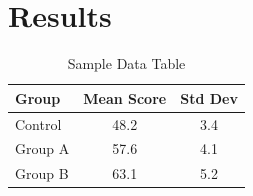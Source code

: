 \section{Results}
\label{sec:results}

\lipsum[5]

\begin{table}[H]
  \centering
  \caption{Sample Data Table}
  \label{tab:sample}
  \begin{tabular}{lcc}
    \toprule
    \textbf{Group} & \textbf{Mean Score} & \textbf{Std Dev} \\
    \midrule
    Control  & 48.2 & 3.4 \\
    Group A  & 57.6 & 4.1 \\
    Group B  & 63.1 & 5.2 \\
    \bottomrule
  \end{tabular}
\end{table}
